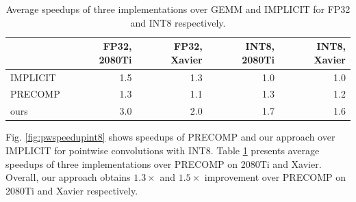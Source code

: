 \begin{table}[]
\setlength{\tabcolsep}{2.5pt}
\caption{Average speedups of three implementations over GEMM and IMPLICIT for FP32 and INT8 respectively.}
\vspace{-3mm}
\label{tab:pwspeedups}
\centering
{}
\begin{threeparttable}
\begin{tabular}{l|r|r|r|r}
\toprule
& FP32, 2080Ti & FP32, Xavier &INT8, 2080Ti&INT8, Xavier\\
\midrule
IMPLICIT & 1.5 & 1.3 & 1.0 & 1.0\\
PRECOMP  & 1.3 & 1.1 & 1.3 & 1.2\\
ours     & 3.0 & 2.0 & 1.7 & 1.6\\
\bottomrule
\end{tabular}
\end{threeparttable}
\end{table}



  Fig. \ref{fig:pwspeedupint8} shows speedups of PRECOMP and our approach over IMPLICIT for
pointwise convolutions with INT8. Table \ref{tab:pwspeedups} presents average speedups of three implementations over PRECOMP on 2080Ti and Xavier. Overall, our approach obtains $1.3\times$ and $1.5\times$ improvement over PRECOMP on 2080Ti and Xavier respectively.


